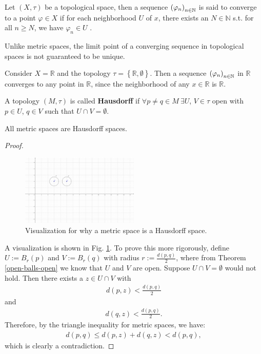\begin{defn}
	Let $(X, \tau)$ be a topological space, then a sequence $\seq[\varphi_n]$ is said to converge to a point $\varphi\in X$ if for each neighborhood $U$ of $x$, there exists an $N\in\mathbb N$ s.t. for all $n\geq N$, we have $\varphi_n\in U$ \cite{289740}.
\end{defn}

\begin{remark}
	Unlike metric spaces, the limit point of a converging sequence in topological spaces is not guaranteed to be unique.
\end{remark}

\begin{exmp}
	Consider $X = \mathbb R$ and the topology $\tau = \left\{\mathbb R, \emptyset\right\}$. Then a sequence $\seq[\varphi_n]$ in $\mathbb R$ converges to any point in $\mathbb R$, since the neighborhood of any $x\in \mathbb R$ is $\mathbb R$.
\end{exmp}

\begin{defn}[Hausdorff]
	A topology $\left(M, \tau\right)$ is called \textbf{Hausdorff} if $\forall p\ne q \in M \ \exists U$, $V\in \tau$ open with $p\in U$, $q\in V$ such that $U\cap V = \emptyset$.  
\end{defn} 

\begin{lemma}
	All metric spaces are Hausdorff spaces. 
\end{lemma}

\begin{proof}
	\begin{figure}[h!]		
		\centering 
		\includegraphics[trim = {3.8cm 5.8cm 9.7cm 2.8cm}, width=0.5\textwidth, clip]{Figures/metric-spaces-Hausdorff-spaces-v2.png}
		\caption{Visualization for why a metric space is a Hausdorff space.}
		\label{metric-space-Hausdorff-space}
	\end{figure} 
	A visualization is shown in Fig. \ref{metric-space-Hausdorff-space}. To prove this more rigorously, define $U := B_{r}(p)$ and $V:=B_{r}(q)$ with radius $r := \frac{d(p, q)}{2}$, where from Theorem \ref{open-balls-open} we know that $U$ and $V$ are open. Suppose $U\cap V = \emptyset$ would not hold. Then there exists a $z\in U\cap V$ with 
	\begin{align}
		d(p, z) < \frac{d(p, q)}{2}
	\end{align}
	and 
	\begin{align}
		d(q, z) < \frac{d(p, q)}{2}. 
	\end{align}
	Therefore, by the triangle inequality for metric spaces, we have: 
	\begin{align}
		d(p, q) \leq d(p, z) + d(q, z) < d(p, q), 
	\end{align}
	which is clearly a contradiction. 
\end{proof}

